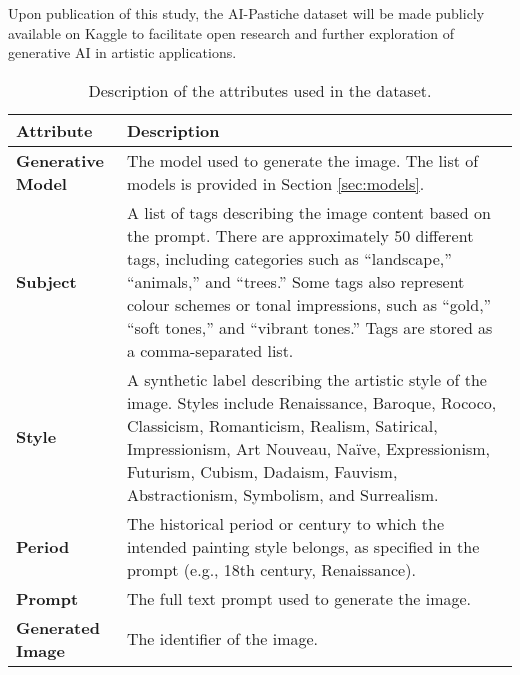 \documentclass[sn-mathphys]{sn-jnl}
\begin{document}
Upon publication of this study, the AI-Pastiche dataset will be made publicly available on Kaggle to facilitate open research and further exploration of generative AI in artistic applications.

\begin{table}[h]
\label{tab:metadata}
    \centering
    \renewcommand{\arraystretch}{1.3} %
    \begin{tabularx}{\textwidth}{|>{\centering\arraybackslash}m{3.5cm}|X|}
        \hline
        \textbf{Attribute} & \textbf{Description} \\ 
        \hline
        \textbf{Generative Model} & The model used to generate the image. The list of models is provided in Section \ref{sec:models}. \\ 
        \hline
        \textbf{Subject} & A list of tags describing the image content based on the prompt. There are approximately 50 different tags, including categories such as “landscape,” “animals,” and “trees.” Some tags also represent colour schemes or tonal impressions, such as “gold,” “soft tones,” and “vibrant tones.” Tags are stored as a comma-separated list. \\ 
        \hline
        \textbf{Style} & A synthetic label describing the artistic style of the image. Styles include Renaissance, Baroque, Rococo, Classicism, Romanticism, Realism, Satirical, Impressionism, Art Nouveau, Naïve, Expressionism, Futurism, Cubism, Dadaism, Fauvism, Abstractionism, Symbolism, and Surrealism. \\ 
        \hline
        \textbf{Period} & The historical period or century to which the intended painting style belongs, as specified in the prompt (e.g., 18th century, Renaissance). \\ 
        \hline
        \textbf{Prompt} & The full text prompt used to generate the image. \\ 
        \hline
        \textbf{Generated Image} & The identifier of the image. \\ 
        \hline
    \end{tabularx}
    \caption{Description of the attributes used in the dataset.}
    \label{tab:attributes}
\end{table}
\end{document}
